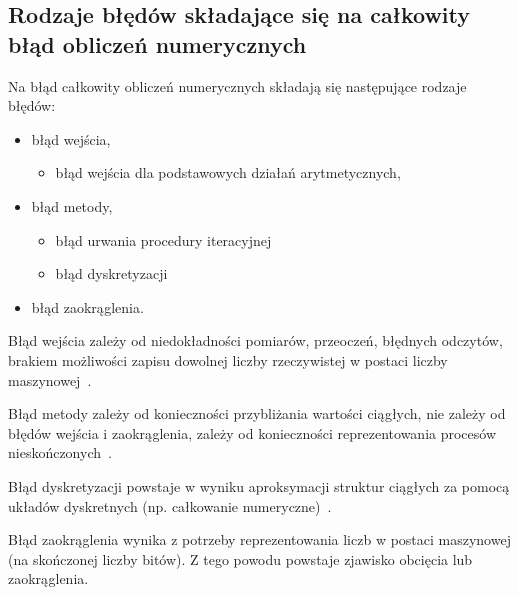 \documentclass[wi]{zut}
\begin{document}


\subsection{Rodzaje błędów składające się na całkowity błąd obliczeń numerycznych}
Na błąd całkowity obliczeń numerycznych składają się następujące rodzaje błędów:
\begin{itemize}
    \item błąd wejścia,
    \begin{itemize}
        \item błąd wejścia dla podstawowych działań arytmetycznych, 
    \end{itemize}
    \item błąd metody,
    \begin{itemize}
        \item błąd urwania procedury iteracyjnej
        \item błąd dyskretyzacji
    \end{itemize}
    \item błąd zaokrąglenia.
\end{itemize}

Błąd wejścia zależy od niedokładności pomiarów, przeoczeń, błędnych odczytów, brakiem możliwości zapisu dowolnej liczby rzeczywistej w postaci liczby maszynowej~\cite{Piela_Wstep}.

Błąd metody zależy od konieczności przybliżania wartości ciągłych, nie zależy od błędów wejścia i zaokrąglenia, zależy od konieczności reprezentowania procesów nieskończonych~\cite{Piela_Wstep}.

Błąd dyskretyzacji powstaje w wyniku aproksymacji struktur ciągłych za pomocą układów dyskretnych (np. całkowanie numeryczne)~\cite{Piela_Wstep}.

Błąd zaokrąglenia wynika z potrzeby reprezentowania liczb w postaci maszynowej (na skończonej liczby bitów). Z tego powodu powstaje zjawisko obcięcia lub zaokrąglenia.
\end{document}
